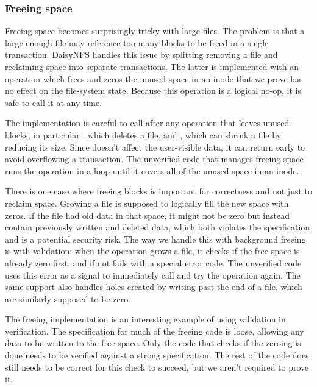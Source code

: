 \subsubsection{Freeing space}
\label{sec:dafny:freeing}

Freeing space becomes surprisingly tricky with large files. The problem is that
a large-enough file may reference too many blocks to be
freed in a single transaction.
DaisyNFS handles this issue by splitting removing a file and reclaiming space
into separate transactions. The latter is implemented with an operation
 which frees and zeros the unused space in an inode that
we prove has no effect on the file-system state. Because this operation is a
logical no-op, it is safe to call it at any time.

The implementation is careful to call  after any operation
that leaves unused blocks, in particular , which deletes a file, and
, which can shrink a file by reducing its size. Since
 doesn't affect the user-visible data, it can return early to
avoid overflowing a transaction. The unverified code that manages freeing space
runs the operation in a loop until it covers all of the unused space in an
inode.

There is one case where freeing blocks is important for correctness and not just
to reclaim space. Growing a file is supposed to logically fill the new space
with zeros. If the file had old data in that space, it might not be zero but
instead contain previously written and deleted data, which both violates the specification and
is a potential security risk. The way we handle this with background freeing is
with validation: when the  operation grows a file, it checks if the
free space is already zero first, and if not fails with a special error code. The
unverified code uses this error as a signal to immediately call
 and try the operation again. The same support also handles
holes created by writing past the end of a file, which are similarly supposed to
be zero.

The freeing implementation is an interesting example of using validation in
verification. The specification for much of the freeing code is loose, allowing
any data to be written to the free space. Only the code that checks if the
zeroing is done needs to be verified against a strong specification. The rest of
the code does still needs to be correct for this check to succeed, but we
aren't required to prove it.


